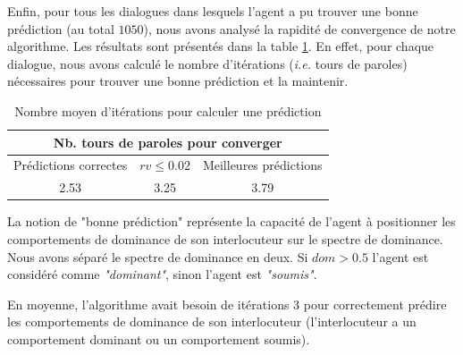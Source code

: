 	Enfin, pour tous les dialogues dans lesquels l'agent a pu trouver une bonne prédiction (au total $ 1050 $), nous avons analysé la rapidité de convergence de notre algorithme. Les résultats sont présentés dans la table \ref {tab:conv}. En effet, pour chaque dialogue, nous avons calculé le nombre d'itérations (\emph{i.e.} tours de paroles) nécessaires pour trouver une bonne prédiction et la maintenir. 
	
	
	\begin{table}[h]
		\centering
		
		\caption{Nombre moyen d'itérations pour calculer une prédiction} 
		\begin{tabular}{|c|c|c|}
			\hline
			\multicolumn{3}{|c|}{Nb. tours de paroles pour converger} \\
			\hline
			Prédictions correctes & $rv \leq 0.02$ & Meilleures prédictions \\
			\hline
			2.53 & 3.25 & 3.79\\
			\hline
		\end{tabular}
		
		\label{tab:conv}
	\end{table}
	
	La notion de "bonne prédiction" représente la capacité de l'agent à positionner les comportements de dominance de son interlocuteur sur le spectre de dominance. Nous avons séparé le spectre de dominance en deux. Si $dom > 0.5$ l'agent est considéré comme \emph{"dominant"}, sinon l'agent est \emph{"soumis"}.
	
	
	En moyenne, l'algorithme avait besoin de itérations $3$ pour correctement prédire les comportements de dominance de son interlocuteur (l'interlocuteur a un comportement dominant ou un comportement soumis). 
	
